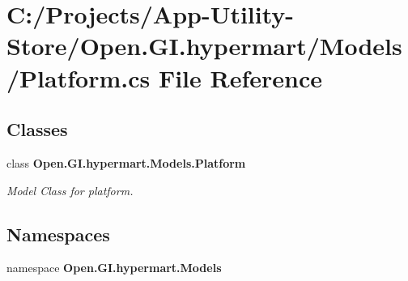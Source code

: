 \section{C\+:/\+Projects/\+App-\/\+Utility-\/\+Store/\+Open.G\+I.\+hypermart/\+Models/\+Platform.cs File Reference}
\label{_models_2_platform_8cs}
\subsection*{Classes}
\begin{DoxyCompactItemize}
\item 
class \textbf{ Open.\+G\+I.\+hypermart.\+Models.\+Platform}
\begin{DoxyCompactList}\small\item\em Model Class for platform. \end{DoxyCompactList}\end{DoxyCompactItemize}
\subsection*{Namespaces}
\begin{DoxyCompactItemize}
\item 
namespace \textbf{ Open.\+G\+I.\+hypermart.\+Models}
\end{DoxyCompactItemize}
